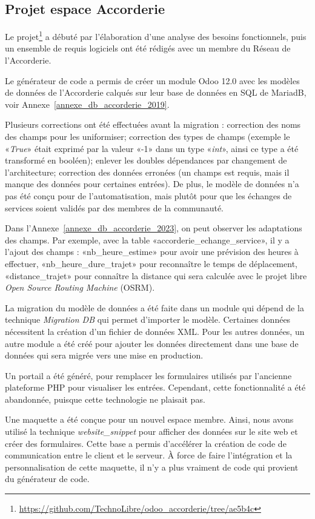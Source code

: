 \subsection{Projet espace Accorderie}

Le projet\footnote{\url{https://github.com/TechnoLibre/odoo_accorderie/tree/ae5b4c}} a débuté par l'élaboration d'une analyse des besoins fonctionnels, puis un ensemble de requis logiciels ont été rédigés avec un membre du Réseau de l'Accorderie.

Le générateur de code a permis de créer un module Odoo 12.0 avec les modèles de données de l'Accorderie calqués sur leur base de données en SQL de MariadB, voir Annexe~\ref{annexe_db_accorderie_2019}.

Plusieurs corrections ont été effectuées avant la migration : correction des noms des champs pour les uniformiser; correction des types de champs (exemple le «\textit{True}» était exprimé par la valeur «-1» dans un type «\textit{int}», ainsi ce type a été transformé en booléen); enlever les doubles dépendances par changement de l’architecture; correction des données erronées (un champs est requis, mais il manque des données pour certaines entrées). De plus, le modèle de données n’a pas été conçu pour de l’automatisation, mais plutôt pour que les échanges de services soient validés par des membres de la communauté.

Dans l'Annexe~\ref{annexe_db_accorderie_2023}, on peut observer les adaptations des champs. Par exemple, avec la table «accorderie\_echange\_service», il y a l'ajout des champs : «nb\_heure\_estime» pour avoir une prévision des heures à effectuer, «nb\_heure\_dure\_trajet» pour reconnaître le temps de déplacement, «distance\_trajet» pour connaître la distance qui sera calculée avec le projet libre \textit{Open Source Routing Machine} (OSRM).

La migration du modèle de données a été faite dans un module qui dépend de la technique \textit{Migration DB }qui permet d'importer le modèle. Certaines données nécessitent la création d’un fichier de données XML. Pour les autres données, un autre module a été créé pour ajouter les données directement dans une base de données qui sera migrée vers une mise en production.

Un portail a été généré, pour remplacer les formulaires utilisés par l'ancienne plateforme PHP pour visualiser les entrées. Cependant, cette fonctionnalité a été abandonnée, puisque cette technologie ne plaisait pas.

Une maquette a été conçue pour un nouvel espace membre. Ainsi, nous avons utilisé la technique \textit{website\_snippet} pour afficher des données sur le site web et créer des formulaires. Cette base a permis d’accélérer la création de code de communication entre le client et le serveur. À force de faire l’intégration et la personnalisation de cette maquette, il n’y a plus vraiment de code qui provient du générateur de code.

